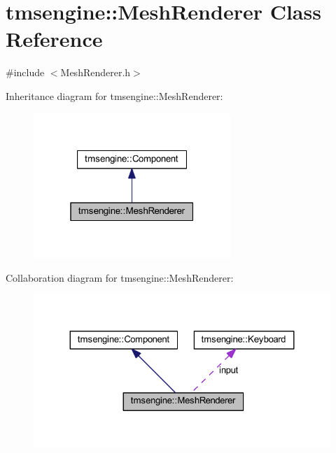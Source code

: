 \hypertarget{classtmsengine_1_1_mesh_renderer}{}\section{tmsengine\+:\+:Mesh\+Renderer Class Reference}
\label{classtmsengine_1_1_mesh_renderer}


{\ttfamily \#include $<$Mesh\+Renderer.\+h$>$}



Inheritance diagram for tmsengine\+:\+:Mesh\+Renderer\+:\nopagebreak
\begin{figure}[H]
\begin{center}
\leavevmode
\includegraphics[width=211pt]{classtmsengine_1_1_mesh_renderer__inherit__graph}
\end{center}
\end{figure}


Collaboration diagram for tmsengine\+:\+:Mesh\+Renderer\+:\nopagebreak
\begin{figure}[H]
\begin{center}
\leavevmode
\includegraphics[width=324pt]{classtmsengine_1_1_mesh_renderer__coll__graph}
\end{center}
\end{figure}
